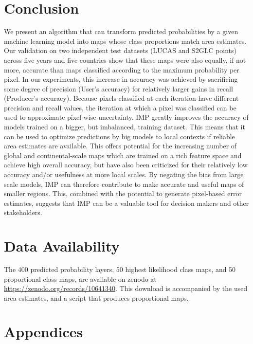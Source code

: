 \section{Conclusion}

    We present an algorithm that can transform predicted probabilities by a given machine learning model into maps whose class proportions match area estimates. Our validation on two independent test datasets (LUCAS and S2GLC points) across five years and five countries show that these maps were also equally, if not more, accurate than maps classified according to the maximum probability per pixel. In our experiments, this increase in accuracy was achieved by sacrificing some degree of precision (User's accuracy) for relatively larger gains in recall (Producer's accuracy). Because pixels classified at each iteration have different precision and recall values, the iteration at which a pixel was classified can be used to approximate pixel-wise uncertainty. 
    IMP greatly improves the accuracy of models trained on a bigger, but imbalanced, training dataset. This means that it can be used to optimize predictions by big models to local contexts if reliable area estimates are available. This offers potential for the increasing number of global and continental-scale maps which are trained on a rich feature space and achieve high overall accuracy, but have also been criticized for their relatively low accuracy and/or usefulness at more local scales. By negating the bias from large scale models, IMP can therefore contribute to make accurate and useful maps of smaller regions. This, combined with the potential to generate pixel-based error estimates, suggests that IMP can be a valuable tool for decision makers and other stakeholders.

\section{Data Availability}
The 400 predicted probability layers, 50 highest likelihood class maps, and 50 proportional class maps, are available on zenodo at \url{https://zenodo.org/records/10641340}. This download is accompanied by the used area estimates, and a script that produces proportional maps.

\section{Appendices}

